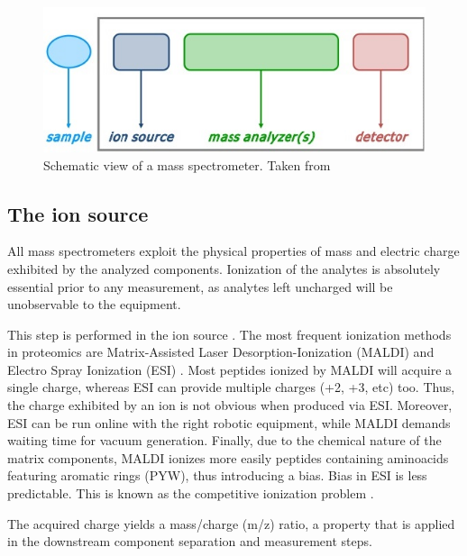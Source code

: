 \documentclass[11pt, a4paper]{report}
\begin{document}
\begin{figure}[!h]
\includegraphics[width=\textwidth]{mass_spectrometer}
\caption[]{Schematic view of a mass spectrometer. Taken from \footnotemark{}}
\label{fig:mass_spectrometer}
\end{figure}


\subsection{The ion source}
\label{subsec:the_ion_source}

All mass spectrometers exploit the physical properties of mass and electric charge exhibited by the analyzed components. Ionization of the analytes is absolutely essential prior to any measurement, as analytes left uncharged will be unobservable to the equipment.


This step is performed in the ion source \cite{Barsnes2008}. The most frequent ionization methods in proteomics are Matrix-Assisted Laser Desorption-Ionization (\ac{MALDI}) and Electro Spray Ionization (\ac{ESI}) \cite{Mirzaei2016}. Most peptides ionized by MALDI will acquire a single charge, whereas ESI can provide multiple charges (+2, +3, etc) too. Thus, the charge exhibited by an ion is not obvious when produced via ESI. Moreover, ESI can be run online with the right robotic equipment, while MALDI demands waiting time for vacuum generation. Finally, due to the chemical nature of the matrix components, MALDI ionizes more easily peptides containing aminoacids featuring aromatic rings (PYW), thus introducing a bias. Bias in ESI is less predictable. This is known as the competitive ionization problem \cite{Tang2004}.

The acquired charge yields a mass/charge (\ac{m/z}) ratio, a property that is applied in the downstream component separation and measurement steps.
\end{document}
